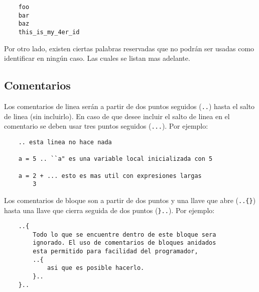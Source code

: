 \documentclass[12pt,letterpaper,titlepage,oneside,openright]{book}
\newcommand{\ttcode}[1]{(\texttt{#1})}
\begin{document}
\begin{center}
\begin{minipage}{\linewidth}
\begin{lstlisting}
    foo
    bar
    baz
    this_is_my_4er_id
\end{lstlisting}
\end{minipage}
\end{center}

Por otro lado, existen ciertas palabras reservadas que no podrán ser usadas como
identificar en ningún caso. Las cuales se listan mas adelante.

\subsection{Comentarios}

Los comentarios de linea serán a partir de dos puntos seguidos \ttcode{..} hasta
el salto de linea (sin incluirlo). En caso de que desee incluir el salto de
linea en el comentario se deben usar tres puntos seguidos \ttcode{...}. Por
ejemplo:

\begin{center}
\begin{minipage}{\linewidth}
\begin{lstlisting}
    .. esta linea no hace nada

    a = 5 .. ``a" es una variable local inicializada con 5

    a = 2 + ... esto es mas util con expresiones largas
        3
\end{lstlisting}
\end{minipage}
\end{center}

Los comentarios de bloque son a partir de dos puntos y una llave que abre
\ttcode{..\{\}} hasta una llave que cierra seguida de dos puntos \ttcode{\}..}. Por
ejemplo:

\begin{center}
\begin{minipage}{\linewidth}
\begin{lstlisting}
    ..{
        Todo lo que se encuentre dentro de este bloque sera
        ignorado. El uso de comentarios de bloques anidados
        esta permitido para facilidad del programador,
        ..{
            asi que es posible hacerlo.
        }..
    }..    
\end{lstlisting}
\end{minipage}
\end{center}
\end{document}
